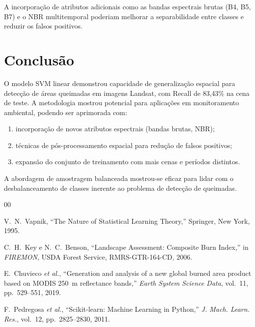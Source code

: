 \documentclass[conference]{IEEEtran}
\begin{document}
A incorporação de atributos adicionais como as bandas espectrais brutas (B4,
B5, B7) e o NBR multitemporal poderiam melhorar a separabilidade entre classes
e reduzir os falsos positivos.

\section{Conclusão}

O modelo SVM linear demonstrou capacidade de generalização espacial para
detecção de áreas queimadas em imagens Landsat, com Recall de 83,43\% na
cena de teste. A metodologia mostrou potencial para aplicações em
monitoramento ambiental, podendo ser aprimorada com:

\begin{enumerate}
  \item incorporação de novos atributos espectrais (bandas brutas, NBR);
  \item técnicas de pós-processamento espacial para redução de falsos positivos;
  \item expansão do conjunto de treinamento com mais cenas e períodos distintos.
\end{enumerate}

A abordagem de amostragem balanceada mostrou-se eficaz para lidar com o
desbalanceamento de classes inerente ao problema de detecção de queimadas.

\begin{thebibliography}{00}

V.~N.~Vapnik,
``The Nature of Statistical Learning Theory,''
Springer, New York, 1995.

C.~H.~Key e N.~C.~Benson,
``Landscape Assessment: Composite Burn Index,''
in \textit{FIREMON}, USDA Forest Service, RMRS-GTR-164-CD, 2006.

E.~Chuvieco \textit{et al.},
``Generation and analysis of a new global burned area product based on
MODIS 250~m reflectance bands,''
\textit{Earth System Science Data}, vol.~11, pp.~529--551, 2019.

F.~Pedregosa \textit{et al.},
``Scikit-learn: Machine Learning in Python,''
\textit{J. Mach. Learn. Res.}, vol.~12, pp.~2825--2830, 2011.

\end{thebibliography}
\end{document}

